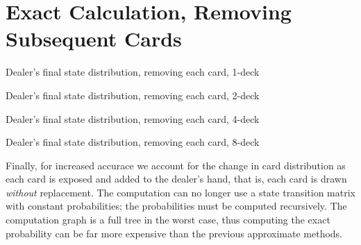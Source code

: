 \section{Exact Calculation, Removing Subsequent Cards}
\label{sec:dealer:exact}

\begin{table}[ht!]
\caption{Dealer's final state distribution, removing each card, 1-deck}
\begin{center}

\end{center}
\label{tab:dealer-final-unified-exact-1}
\end{table}

\begin{table}[ht!]
\caption{Dealer's final state distribution, removing each card, 2-deck}
\begin{center}

\end{center}
\label{tab:dealer-final-unified-exact-2}
\end{table}

\begin{table}[ht!]
\caption{Dealer's final state distribution, removing each card, 4-deck}
\begin{center}

\end{center}
\label{tab:dealer-final-unified-exact-4}
\end{table}

\begin{table}[ht!]
\caption{Dealer's final state distribution, removing each card, 8-deck}
\begin{center}

\end{center}
\label{tab:dealer-final-unified-exact-8}
\end{table}

Finally, for increased accurace we account for the change in 
card distribution as each card is exposed and added to the dealer's hand, 
that is, each card is drawn \emph{without} replacement.
The computation can no longer use a state transition matrix with
constant probabilities; 
the probabilities must be computed recursively.
The computation graph is a full tree in the worst case, 
thus computing the exact probability can be far more expensive
than the previous approximate methods.  

